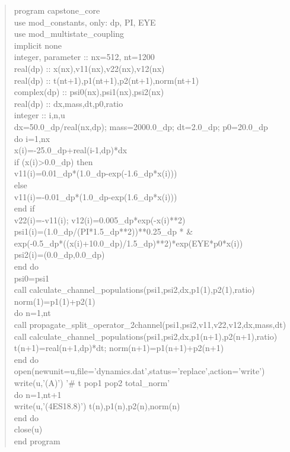 \documentclass[UTF8,openany,11pt,fontset=fandol]{ctexbook}
\begin{document}
\begin{quote}
program capstone\_core\\
use mod\_constants, only: dp, PI, EYE\\
use mod\_multistate\_coupling\\
implicit none\\
integer, parameter :: nx=512, nt=1200\\
real(dp) :: x(nx),v11(nx),v22(nx),v12(nx)\\
real(dp) :: t(nt+1),p1(nt+1),p2(nt+1),norm(nt+1)\\
complex(dp) :: psi0(nx),psi1(nx),psi2(nx)\\
real(dp) :: dx,mass,dt,p0,ratio\\
integer :: i,n,u\\
dx=50.0\_dp/real(nx,dp); mass=2000.0\_dp; dt=2.0\_dp; p0=20.0\_dp\\
do i=1,nx\\
x(i)=-25.0\_dp+real(i-1,dp)*dx\\
if (x(i)\textgreater0.0\_dp) then\\
v11(i)=0.01\_dp*(1.0\_dp-exp(-1.6\_dp*x(i)))\\
else\\
v11(i)=-0.01\_dp*(1.0\_dp-exp(1.6\_dp*x(i)))\\
end if\\
v22(i)=-v11(i); v12(i)=0.005\_dp*exp(-x(i)**2)\\
psi1(i)=(1.0\_dp/(PI*1.5\_dp**2))**0.25\_dp * \&\\
exp(-0.5\_dp*((x(i)+10.0\_dp)/1.5\_dp)**2)*exp(EYE*p0*x(i))\\
psi2(i)=(0.0\_dp,0.0\_dp)\\
end do\\
psi0=psi1\\
call calculate\_channel\_populations(psi1,psi2,dx,p1(1),p2(1),ratio)\\
norm(1)=p1(1)+p2(1)\\
do n=1,nt\\
call
propagate\_split\_operator\_2channel(psi1,psi2,v11,v22,v12,dx,mass,dt)\\
call
calculate\_channel\_populations(psi1,psi2,dx,p1(n+1),p2(n+1),ratio)\\
t(n+1)=real(n+1,dp)*dt; norm(n+1)=p1(n+1)+p2(n+1)\\
end do\\
open(newunit=u,file='dynamics.dat',status='replace',action='write')\\
write(u,'(A)') '\# t pop1 pop2 total\_norm'\\
do n=1,nt+1\\
write(u,'(4ES18.8)') t(n),p1(n),p2(n),norm(n)\\
end do\\
close(u)\\
end program
\end{quote}
\end{document}

